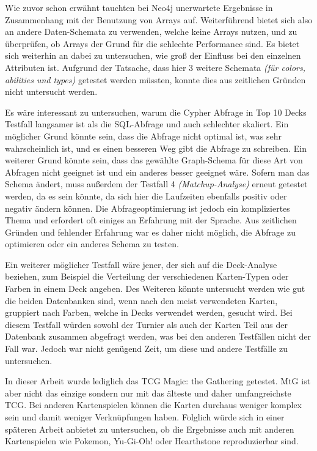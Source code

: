 Wie zuvor schon erwähnt tauchten bei Neo4j unerwartete Ergebnisse in Zusammenhang mit der Benutzung von Arrays auf. Weiterführend bietet sich also an andere Daten-Schemata zu verwenden, welche keine Arrays nutzen, und zu überprüfen, ob Arrays der Grund für die schlechte Performance sind. Es bietet sich weiterhin an dabei zu untersuchen, wie groß der Einfluss bei den einzelnen Attributen ist. Aufgrund der Tatsache, dass hier 3 weitere Schemata \emph{(für colors, abilities und types)} getestet werden müssten, konnte dies aus zeitlichen Gründen nicht untersucht werden.

Es wäre interessant zu untersuchen, warum die Cypher Abfrage in Top 10 Decks Testfall langsamer ist als die SQL-Abfrage und auch schlechter skaliert. Ein möglicher Grund könnte sein, dass die Abfrage nicht optimal ist, was sehr wahrscheinlich ist, und es einen besseren Weg gibt die Abfrage zu schreiben. Ein weiterer Grund könnte sein, dass das gewählte Graph-Schema für diese Art von Abfragen nicht geeignet ist und ein anderes besser geeignet wäre. Sofern man das Schema ändert, muss außerdem der Testfall 4 \emph{(Matchup-Analyse)} erneut getestet werden, da es sein könnte, da sich hier die Laufzeiten ebenfalls positiv oder negativ ändern können. Die Abfrageoptimierung ist jedoch ein kompliziertes Thema und erfordert oft einiges an Erfahrung mit der Sprache. Aus zeitlichen Gründen und fehlender Erfahrung war es daher nicht möglich, die Abfrage zu optimieren oder ein anderes Schema zu testen.

Ein weiterer möglicher Testfall wäre jener, der sich auf die Deck-Analyse beziehen, zum Beispiel die Verteilung der verschiedenen Karten-Typen oder Farben in einem Deck angeben. Des Weiteren könnte untersucht werden wie gut die beiden Datenbanken sind, wenn nach den meist verwendeten Karten, gruppiert nach Farben, welche in Decks verwendet werden, gesucht wird. Bei diesem Testfall würden sowohl der Turnier als auch der Karten Teil aus der Datenbank zusammen abgefragt werden, was bei den anderen Testfällen nicht der Fall war. Jedoch war nicht genügend Zeit, um diese und andere Testfälle zu untersuchen.

In dieser Arbeit wurde lediglich das \ac{TCG} Magic: the Gathering getestet. \ac{MtG} ist aber nicht das einzige sondern nur mit das älteste und daher umfangreichste \ac{TCG}. Bei anderen Kartenspielen können die Karten durchaus weniger komplex sein und damit weniger Verknüpfungen haben. Folglich würde sich in einer späteren Arbeit anbietet zu untersuchen, ob die Ergebnisse auch mit anderen Kartenspielen wie Pokemon, Yu-Gi-Oh! oder Hearthstone reproduzierbar sind. 
